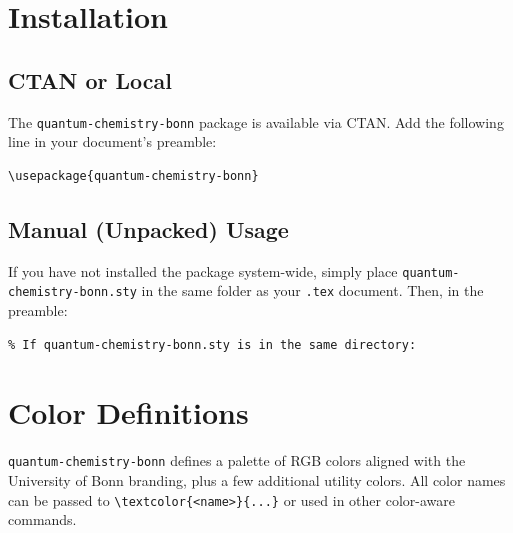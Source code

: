 \documentclass[a4paper,12pt]{article}
\begin{document}
\section{Installation}
\label{sec:installation}

\subsection{CTAN or Local }
 The \texttt{quantum-chemistry-bonn} package is available via CTAN.
 Add the following line in your document’s preamble:
\begin{verbatim}
\usepackage{quantum-chemistry-bonn}
\end{verbatim}

\subsection{Manual (Unpacked) Usage}
If you have not installed the package system-wide, simply place
\texttt{quantum-\hspace{0pt}chemistry-\hspace{0pt}bonn.sty} in the same folder as your
\texttt{.tex} document. Then, in the preamble:
\begin{verbatim}
% If quantum-chemistry-bonn.sty is in the same directory:

\end{verbatim}


\section{Color Definitions}
\label{sec:colors}
\texttt{quantum-chemistry-bonn} defines a palette of RGB colors aligned with the University of Bonn branding, plus a few additional utility colors. All color names can be passed to \verb|\textcolor{<name>}{...}| or used in other color-aware commands.
\end{document}
